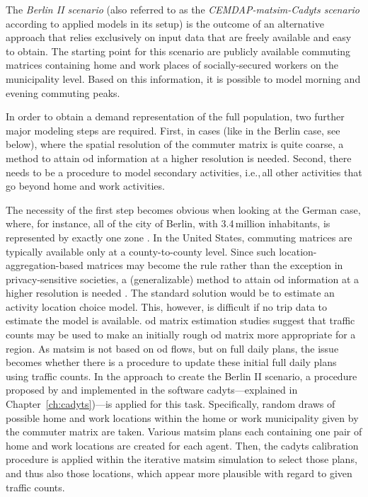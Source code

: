 The \textit{Berlin II scenario} (also referred to as the \emph{CEMDAP-\gls{matsim}-Cadyts scenario} according to applied models in its setup) is the outcome of an alternative approach that relies exclusively on input data that are freely available and easy to obtain. The starting point for this scenario are publicly available commuting matrices containing home and work places of socially-secured workers on the municipality level. Based on this information, it is possible to model morning and evening commuting peaks.

In order to obtain a demand representation of the full population, two further major modeling steps are required. First, in cases (like in the Berlin case, see below), where the spatial resolution of the commuter matrix is quite coarse, a method to attain \gls{od} information at a higher resolution is needed. Second, there needs to be a procedure to model secondary activities, i.e.,\,all other activities that go beyond home and work activities.

The necessity of the first step becomes obvious when looking at the German case, where, for instance, all of the city of Berlin, with 3.4\,million inhabitants, is represented by exactly one zone \citep{BA2010Pendlerstatistik}. In the United States, commuting matrices are typically available only at a county-to-county level. Since such location-aggregation-based matrices may become the rule rather than the exception in privacy-sensitive societies, a (generalizable) method to attain \gls{od} information at a higher resolution is needed \citep{ZiemkeNagelBhat2015IntegratingCemdapMatsimTransferabilityTRB}. The standard solution would be to estimate an activity location choice model. This, however, is difficult if no trip data to estimate the model is available. \gls{od} matrix estimation studies \citep{ZuylenWillumsenMatrix-from-cnts} suggest that traffic counts may be used to make an initially rough \gls{od} matrix more appropriate for a region. As \gls{matsim} is not based on \gls{od} flows, but on full daily plans, the issue becomes whether there is a procedure to update these initial full daily plans using traffic counts. In the approach to create the Berlin II scenario, a procedure proposed by \citet{FloetteroedBierlaireNagel2010Bayesian} and implemented in the software \gls{cadyts}---explained in Chapter~\ref{ch:cadyts})---is applied for this task. Specifically, random draws of possible home and work locations within the home or work municipality given by the commuter matrix are taken. Various \gls{matsim} plans each containing one pair of home and work locations are created for each agent. Then, the \gls{cadyts} calibration procedure is applied within the iterative \gls{matsim} simulation to select those plans, and thus also those locations, which appear more plausible with regard to given traffic counts.

